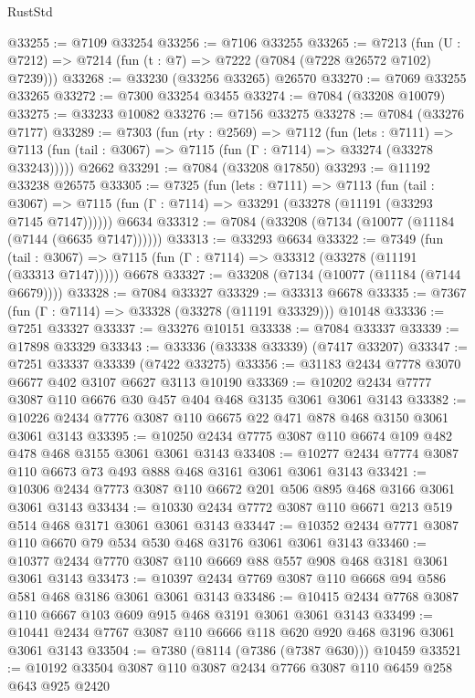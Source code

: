 \begin{lexlean}{RustStd}
\begin{coremodule}
@33255 := @7109 @33254
@33256 := @7106 @33255
@33265 := @7213
    (fun (U : @7212) => @7214 (fun (t : @7) => @7222 (@7084 (@7228 @26572 @7102) @7239)))
@33268 := @33230 (@33256 @33265) @26570
@33270 := @7069 @33255 @33265
@33272 := @7300 @33254 @3455
@33274 := @7084 (@33208 @10079)
@33275 := @33233 @10082
@33276 := @7156 @33275
@33278 := @7084 (@33276 @7177)
@33289 := @7303
    (fun (rty : @2569) =>
    @7112
      (fun (lets : @7111) =>
      @7113 (fun (tail : @3067) => @7115 (fun (Γ : @7114) => @33274 (@33278 @33243)))))
    @2662
@33291 := @7084 (@33208 @17850)
@33293 := @11192 @33238 @26575
@33305 := @7325
    (fun (lets : @7111) =>
    @7113
      (fun (tail : @3067) =>
      @7115 (fun (Γ : @7114) => @33291 (@33278 (@11191 (@33293 @7145 @7147))))))
    @6634
@33312 := @7084 (@33208 (@7134 (@10077 (@11184 (@7144 (@6635 @7147))))))
@33313 := @33293 @6634
@33322 := @7349
    (fun (tail : @3067) => @7115 (fun (Γ : @7114) => @33312 (@33278 (@11191 (@33313 @7147)))))
    @6678
@33327 := @33208 (@7134 (@10077 (@11184 (@7144 @6679))))
@33328 := @7084 @33327
@33329 := @33313 @6678
@33335 := @7367 (fun (Γ : @7114) => @33328 (@33278 (@11191 @33329))) @10148
@33336 := @7251 @33327
@33337 := @33276 @10151
@33338 := @7084 @33337
@33339 := @17898 @33329
@33343 := @33336 (@33338 @33339) (@7417 @33207)
@33347 := @7251 @33337 @33339 (@7422 @33275)
@33356 := @31183 @2434 @7778 @3070 @6677 @402 @3107 @6627 @3113 @10190
@33369 := @10202 @2434 @7777 @3087 @110 @6676 @30 @457 @404 @468 @3135 @3061 @3061 @3143
@33382 := @10226 @2434 @7776 @3087 @110 @6675 @22 @471 @878 @468 @3150 @3061 @3061 @3143
@33395 := @10250 @2434 @7775 @3087 @110 @6674 @109 @482 @478 @468 @3155 @3061 @3061 @3143
@33408 := @10277 @2434 @7774 @3087 @110 @6673 @73 @493 @888 @468 @3161 @3061 @3061 @3143
@33421 := @10306 @2434 @7773 @3087 @110 @6672 @201 @506 @895 @468 @3166 @3061 @3061 @3143
@33434 := @10330 @2434 @7772 @3087 @110 @6671 @213 @519 @514 @468 @3171 @3061 @3061 @3143
@33447 := @10352 @2434 @7771 @3087 @110 @6670 @79 @534 @530 @468 @3176 @3061 @3061 @3143
@33460 := @10377 @2434 @7770 @3087 @110 @6669 @88 @557 @908 @468 @3181 @3061 @3061 @3143
@33473 := @10397 @2434 @7769 @3087 @110 @6668 @94 @586 @581 @468 @3186 @3061 @3061 @3143
@33486 := @10415 @2434 @7768 @3087 @110 @6667 @103 @609 @915 @468 @3191 @3061 @3061 @3143
@33499 := @10441 @2434 @7767 @3087 @110 @6666 @118 @620 @920 @468 @3196 @3061 @3061 @3143
@33504 := @7380 (@8114 (@7386 (@7387 @630))) @10459
@33521 := @10192
    @33504
    @3087
    @110
    @3087
    @2434
    @7766
    @3087
    @110
    @6459
    @258
    @643
    @925
    @2420

\end{coremodule}
\end{lexlean}
